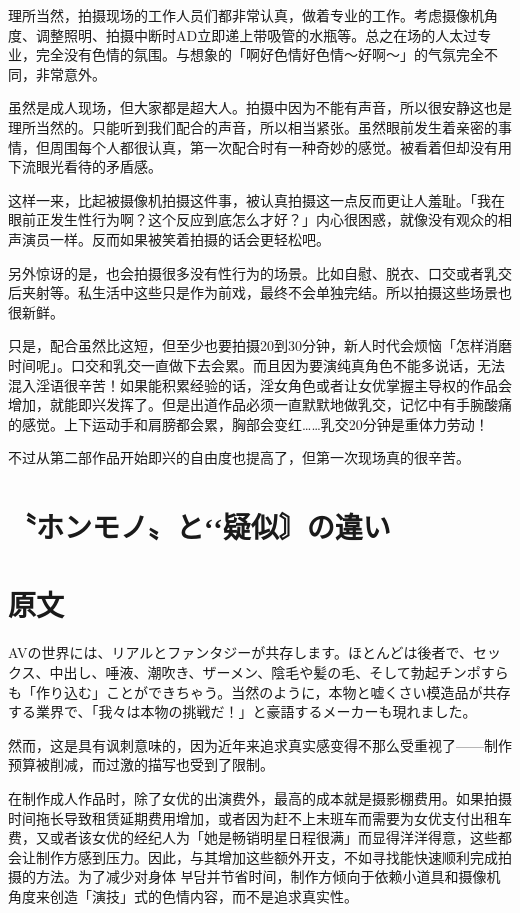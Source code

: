 \documentclass[12pt,UTF8]{ctexbook}
\begin{document}
理所当然，拍摄现场的工作人员们都非常认真，做着专业的工作。考虑摄像机角度、调整照明、拍摄中断时AD立即递上带吸管的水瓶等。总之在场的人太过专业，完全没有色情的氛围。与想象的「啊好色情好色情〜好啊〜」的气氛完全不同，非常意外。

虽然是成人现场，但大家都是超大人。拍摄中因为不能有声音，所以很安静这也是理所当然的。只能听到我们配合的声音，所以相当紧张。虽然眼前发生着亲密的事情，但周围每个人都很认真，第一次配合时有一种奇妙的感觉。被看着但却没有用下流眼光看待的矛盾感。

这样一来，比起被摄像机拍摄这件事，被认真拍摄这一点反而更让人羞耻。「我在眼前正发生性行为啊？这个反应到底怎么才好？」内心很困惑，就像没有观众的相声演员一样。反而如果被笑着拍摄的话会更轻松吧。

另外惊讶的是，也会拍摄很多没有性行为的场景。比如自慰、脱衣、口交或者乳交后夹射等。私生活中这些只是作为前戏，最终不会单独完结。所以拍摄这些场景也很新鲜。

只是，配合虽然比这短，但至少也要拍摄20到30分钟，新人时代会烦恼「怎样消磨时间呢」。口交和乳交一直做下去会累。而且因为要演纯真角色不能多说话，无法混入淫语很辛苦！如果能积累经验的话，淫女角色或者让女优掌握主导权的作品会增加，就能即兴发挥了。但是出道作品必须一直默默地做乳交，记忆中有手腕酸痛的感觉。上下运动手和肩膀都会累，胸部会变红……乳交20分钟是重体力劳动！

不过从第二部作品开始即兴的自由度也提高了，但第一次现场真的很辛苦。

\switchcolumn

\section{〝ホンモノ〟とʻʻ疑似〙の違い}

\switchcolumn

\section*{原文}

AVの世界には、リアルとファンタジーが共存します。ほとんどは後者で、セックス、中出し、唾液、潮吹き、ザーメン、陰毛や髪の毛、そして勃起チンポすらも「作り込む」ことができちゃう。当然のように，本物と嘘くさい模造品が共存する業界で、「我々は本物の挑戦だ！」と豪語するメーカーも現れました。

然而，这是具有讽刺意味的，因为近年来追求真实感变得不那么受重视了——制作预算被削减，而过激的描写也受到了限制。

在制作成人作品时，除了女优的出演费外，最高的成本就是摄影棚费用。如果拍摄时间拖长导致租赁延期费用增加，或者因为赶不上末班车而需要为女优支付出租车费，又或者该女优的经纪人为「她是畅销明星日程很满」而显得洋洋得意，这些都会让制作方感到压力。因此，与其增加这些额外开支，不如寻找能快速顺利完成拍摄的方法。为了减少对身体 부담并节省时间，制作方倾向于依赖小道具和摄像机角度来创造「演技」式的色情内容，而不是追求真实性。
\end{document}
